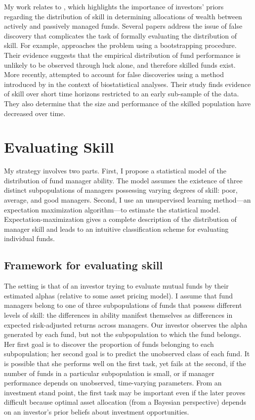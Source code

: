 	My work relates to \citet{Baks2001}, which highlights the importance of investors' priors regarding the distribution of skill in determining allocations of wealth between actively and passively managed funds. Several papers address the issue of false discovery that complicates the task of formally evaluating the distribution of skill. For example, \citet{Kosowski2006} approaches the problem using a bootstrapping procedure. Their evidence suggests that the empirical distribution of fund performance is unlikely to be observed through luck alone, and therefore skilled funds exist. More recently, \citet{Barras2010} attempted to account for false discoveries using a method introduced by \citet{Storey2002} in the context of biostatistical analyses. Their study finds evidence of skill over short time horizons restricted to an early sub-sample of the data. They also determine that the size and performance of the skilled population have decreased over time.


\section{Evaluating Skill}
	My strategy involves two parts.  First, I propose a statistical model of the distribution of fund manager ability.  The model assumes the existence of three distinct subpopulations of managers possessing varying degrees of skill: poor, average, and good managers.  Second, I use an unsupervised learning method---an expectation maximization algorithm---to estimate the statistical model.  Expectation-maximization gives a complete description of the distribution of manager skill and leads to an intuitive classification scheme for evaluating individual funds.

	\subsection{Framework for evaluating skill}
		The setting is that of an investor trying to evaluate mutual funds by their estimated alphas (relative to some asset pricing model). I assume that fund managers belong to one of three subpopulations of funds that possess different levels of skill: the differences in ability manifest themselves as differences in expected risk-adjusted returns across managers. Our investor observes the alpha generated by each fund, but not the subpopulation to which the fund belongs. Her first goal is to discover the proportion of funds belonging to each subpopulation; her second goal is to predict the unobserved class of each fund. It is possible that she performs well on the first task, yet fails at the second, if the number of funds in a particular subpopulation is small, or if manager performance depends on unobserved, time-varying parameters. From an investment stand point, the first task may be important even if the later proves difficult because optimal asset allocation (from a Bayesian perspective) depends on an investor's prior beliefs about investment opportunities.

